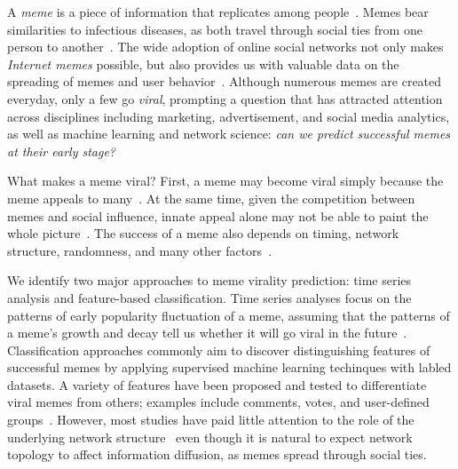 \documentclass[letterpaper]{article}
\begin{document}
A \emph{meme} is a piece of information that replicates among people~\cite{meme}. Memes bear  similarities to infectious diseases, as both travel through social ties from one person to another~\cite{daley_epidemics_1964,goffman1964nature}. The wide adoption of online social networks not only makes \emph{Internet memes} possible, but also provides us with valuable data on the spreading of memes and user behavior~\cite{Vespignani2009,Lazer2009}.
Although numerous memes are created everyday, only a few go \emph{viral}, prompting a question that has attracted attention across disciplines including marketing, advertisement, and social media analytics, as well as machine learning and network science: \emph{can we predict successful memes at their early stage?}


What makes a meme viral? First, a meme may become viral simply because the meme appeals to many~\cite{Berger:2009viral,cataldi2010}.  At the same time, given the competition between memes and social influence, innate appeal alone may not be able to paint the whole picture~\cite{Salganik2006music,Kitsak2010kcore,Mei2012tags}. The success of a meme also depends on timing, network structure, randomness, and many other factors~\cite{Centola2010SpreadExp,Weng:2012scirep,pinto2013using}.


We identify two major approaches to meme virality prediction: time series analysis and feature-based classification. 
Time series analyses focus on the patterns of early popularity fluctuation of a meme, assuming that the patterns of a meme's growth and decay tell us whether it will go viral in the future~\cite{Jamali2009digging,asur_trends_2011,Yang2011temporal}. 
Classification approaches commonly aim to discover distinguishing features of successful memes by applying supervised machine learning techinques with labled datasets. 
A variety of features have been proposed and tested to differentiate viral memes from others; examples include comments, votes, and user-defined groups~\cite{Lerman2010www,Jamali2009digging,Suh2010,Hong2011popu,Mei2012tags}. However, most studies have paid little attention to the role of the underlying network structure~\cite{romero2011popu,ma2013predicting} even though it is natural to expect network topology to affect information diffusion, as memes spread through social ties. 
\end{document}
